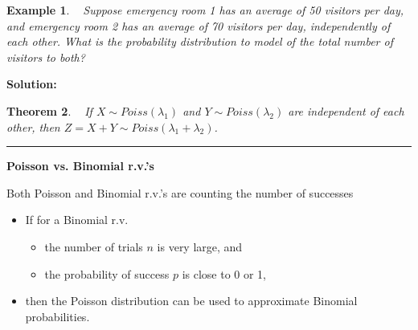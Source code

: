 \documentclass[12pt]{amsart}
\newtheorem{theorem}{Theorem}[section]
\newtheorem{example}[theorem]{Example}
\begin{document}
{%
\begin{example}\ %
Suppose emergency room 1 has an average of 50 visitors per day, and emergency room 2 has an average of 70 visitors per day, independently of each other. What is the probability distribution to model of the total number of visitors to both?
\end{example}
\textbf{Solution:}




\newpage

\begin{theorem}\ %
If $X\sim Poiss(\lambda_1)$ and $Y\sim Poiss(\lambda_2)$ are independent of each other, then $Z=X+Y\sim Poiss(\lambda_1 + \lambda_2)$.
\end{theorem}

\vspace{.5cm}
\hrule
\vspace{.5cm}


\textbf{Poisson vs. Binomial r.v.'s}
\vspace{.5cm}

Both Poisson and Binomial r.v.'s are counting the number of successes

\begin{itemize}
\item If for a Binomial r.v. 
	\begin{itemize}
	\item the number of trials $n$ is very large, and 
	\item the probability of success $p$ is close to 0 or 1,
	\end{itemize}
\item then the Poisson distribution can be used to approximate Binomial probabilities.
\end{itemize}



}
\end{document}
